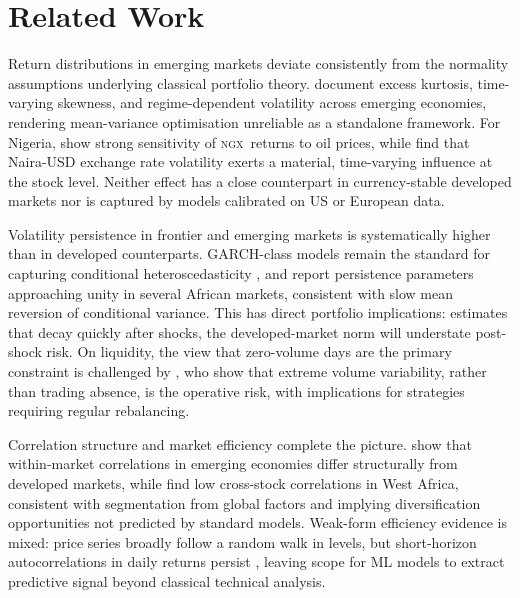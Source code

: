 \documentclass[twoside,11pt]{article}
\newcommand{\ngx}{\textsc{ngx}}
\begin{document}
	\section{Related Work}
	\label{sec:related}
	
	Return distributions in emerging markets deviate consistently from the normality assumptions underlying classical portfolio theory. \citet{bekaert2023globalized} document excess kurtosis, time-varying skewness, and regime-dependent volatility across emerging economies, rendering mean-variance optimisation unreliable as a standalone framework. For Nigeria, \citet{adigwe2015stockmarket} show strong sensitivity of \ngx\ returns to oil prices, while \citet{kumeka2022stockafrica} find that Naira-USD exchange rate volatility exerts a material, time-varying influence at the stock level. Neither effect has a close counterpart in currency-stable developed markets nor is captured by models calibrated on US or European data.
	
	Volatility persistence in frontier and emerging markets is systematically higher than in developed counterparts. GARCH-class models remain the standard for capturing conditional heteroscedasticity \citep{bollerslev2023garch}, and \citet{aawaar2023african} report persistence parameters approaching unity in several African markets, consistent with slow mean reversion of conditional variance. This has direct portfolio implications: estimates that decay quickly after shocks, the developed-market norm will understate post-shock risk. On liquidity, the view that zero-volume days are the primary constraint \citep{bekaert2007liquidity} is challenged by \citet{ngene2022volume}, who show that extreme volume variability, rather than trading absence, is the operative risk, with implications for strategies requiring regular rebalancing.
	
	Correlation structure and market efficiency complete the picture. \citet{bekaert2023globalized} show that within-market correlations in emerging economies differ structurally from developed markets, while \citet{emenike2021westafrica} find low cross-stock correlations in West Africa, consistent with segmentation from global factors and implying diversification opportunities not predicted by standard models. Weak-form efficiency evidence is mixed: price series broadly follow a random walk in levels, but short-horizon autocorrelations in daily returns persist \citep{ferrouhi2021calendar}, leaving scope for ML models to extract predictive signal beyond classical technical analysis.
	
\end{document}
